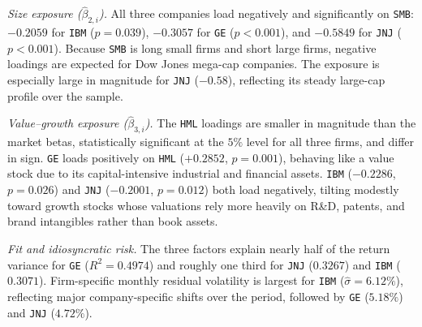\documentclass[11pt,a4paper]{article}
\begin{document}
\textit{Size exposure ($\hat{\beta}_{2,i}$).} All three companies load negatively and significantly on \texttt{SMB}: $-0.2059$ for \texttt{IBM} ($p = 0.039$), $-0.3057$ for \texttt{GE} ($p < 0.001$), and $-0.5849$ for \texttt{JNJ} ($p < 0.001$). Because \texttt{SMB} is long small firms and short large firms, negative loadings are expected for Dow Jones mega-cap companies. The exposure is especially large in magnitude for \texttt{JNJ} ($-0.58$), reflecting its steady large-cap profile over the sample.

\textit{Value--growth exposure ($\hat{\beta}_{3,i}$).} The \texttt{HML} loadings are smaller in magnitude than the market betas, statistically significant at the $5\%$ level for all three firms, and differ in sign. \texttt{GE} loads positively on \texttt{HML} ($+0.2852$, $p = 0.001$), behaving like a value stock due to its capital-intensive industrial and financial assets. \texttt{IBM} ($-0.2286$, $p = 0.026$) and \texttt{JNJ} ($-0.2001$, $p = 0.012$) both load negatively, tilting modestly toward growth stocks whose valuations rely more heavily on R\&D, patents, and brand intangibles rather than book assets.

\textit{Fit and idiosyncratic risk.} The three factors explain nearly half of the return variance for \texttt{GE} ($R^2 = 0.4974$) and roughly one third for \texttt{JNJ} ($0.3267$) and \texttt{IBM} ($0.3071$). Firm-specific monthly residual volatility is largest for \texttt{IBM} ($\hat{\sigma} = 6.12\%$), reflecting major company-specific shifts over the period, followed by \texttt{GE} ($5.18\%$) and \texttt{JNJ} ($4.72\%$).
\end{document}
